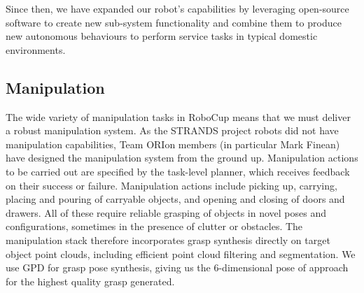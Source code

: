\documentclass[runningheads,a4paper]{llncs}
\newcommand{\teamori}{Team ORIon}
\begin{document}


Since then, we have expanded our robot's capabilities by leveraging open-source software to create new sub-system functionality and combine them to produce new autonomous behaviours to perform service tasks in typical domestic environments.

\subsection{Manipulation}

The wide variety of manipulation tasks in RoboCup means that we must deliver a robust manipulation system.
%
As the STRANDS project robots did not have manipulation capabilities, \teamori{}  members (in particular Mark Finean) have designed the manipulation system from the ground up.
Manipulation actions to be carried out are specified by the task-level planner, which receives feedback on their success or failure.
%
Manipulation actions include picking up, carrying, placing and pouring of carryable objects, and opening and closing of doors and drawers.
%
All of these require reliable grasping of objects in novel poses and configurations, sometimes in the presence of clutter or obstacles.
%
The manipulation stack therefore incorporates grasp synthesis directly on target object point clouds, including efficient point cloud filtering and segmentation.
%
We use GPD \cite{GPD1,GPD2} for grasp pose synthesis, giving us the 6-dimensional pose of approach for the highest quality grasp generated.
\end{document}
